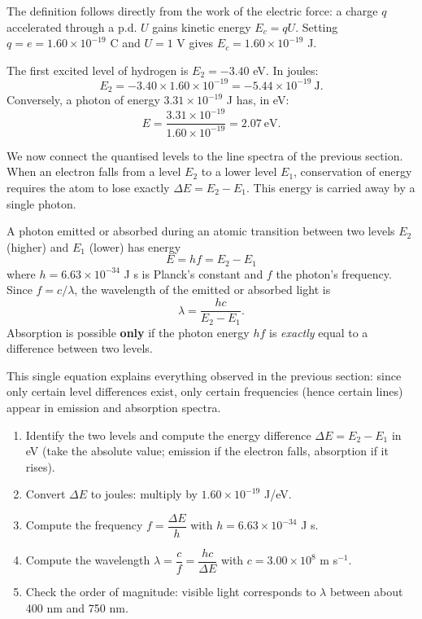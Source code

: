 \documentclass[11pt]{article}
\newcounter{popsec}
\newcounter{popsub}
\newcommand{\courssub}[1]{%
  \stepcounter{popsub}%
  \par\vspace{9pt}\noindent{\popxbold\fontsize{11.5}{13}\selectfont\color{popink}{\color{poporange}\thepopsec.\thepopsub}\hspace{6pt}#1}\par\nopagebreak\vspace{4pt}
}
\begin{document}
The definition follows directly from the work of the electric force: a charge $q$ accelerated through a p.d. $U$ gains kinetic energy $E_c = qU$. Setting $q = e = 1.60\times 10^{-19}$ C and $U = 1$ V gives $E_c = 1.60\times 10^{-19}$ J.

\begin{exemplebox}
The first excited level of hydrogen is $E_2 = -3.40$ eV. In joules:
\[
E_2 = -3.40 \times 1.60\times 10^{-19} = -5.44\times 10^{-19}\ \text{J}.
\]
Conversely, a photon of energy $3.31\times 10^{-19}$ J has, in eV:
\[
E = \frac{3.31\times 10^{-19}}{1.60\times 10^{-19}} = 2.07\ \text{eV}.
\]
\end{exemplebox}

\courssub{The photon relation $E = hf = E_2 - E_1$}

We now connect the quantised levels to the line spectra of the previous section. When an electron falls from a level $E_2$ to a lower level $E_1$, conservation of energy requires the atom to lose exactly $\Delta E = E_2 - E_1$. This energy is carried away by a single photon.

\begin{propriete}
A photon emitted or absorbed during an atomic transition between two levels $E_2$ (higher) and $E_1$ (lower) has energy
\[
\boxed{\;E = hf = E_2 - E_1\;}
\]
where $h = 6.63\times 10^{-34}$ J s is Planck's constant and $f$ the photon's frequency. Since $f = c/\lambda$, the wavelength of the emitted or absorbed light is
\[
\lambda = \frac{hc}{E_2 - E_1}.
\]
Absorption is possible \textbf{only} if the photon energy $hf$ is \emph{exactly} equal to a difference between two levels.
\end{propriete}

This single equation explains everything observed in the previous section: since only certain level differences exist, only certain frequencies (hence certain lines) appear in emission and absorption spectra.

\begin{methode}
\begin{enumerate}
\item Identify the two levels and compute the energy difference $\Delta E = E_2 - E_1$ in eV (take the absolute value; emission if the electron falls, absorption if it rises).
\item Convert $\Delta E$ to joules: multiply by $1.60\times 10^{-19}$ J/eV.
\item Compute the frequency $f = \dfrac{\Delta E}{h}$ with $h = 6.63\times 10^{-34}$ J s.
\item Compute the wavelength $\lambda = \dfrac{c}{f} = \dfrac{hc}{\Delta E}$ with $c = 3.00\times 10^{8}$ m s$^{-1}$.
\item Check the order of magnitude: visible light corresponds to $\lambda$ between about 400 nm and 750 nm.
\end{enumerate}
\end{methode}
\end{document}
